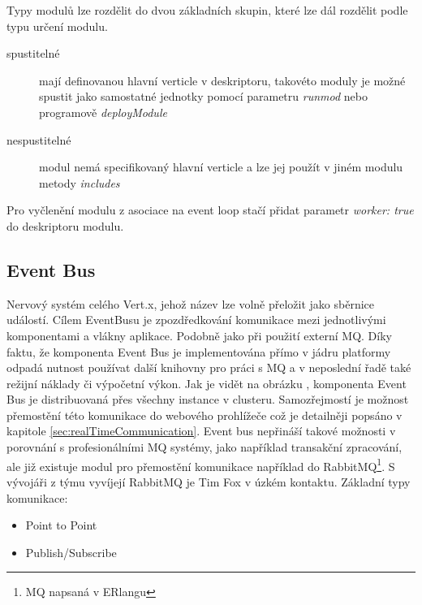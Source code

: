 Typy modulů lze rozdělit do dvou základních skupin, které lze dál rozdělit podle typu určení modulu.

\begin{description}
\item[spustitelné]{mají definovanou hlavní verticle v deskriptoru, takovéto moduly je možné spustit jako samostatné jednotky pomocí parametru \emph{runmod} nebo programově \emph{deployModule} }
\item[nespustitelné]{modul nemá specifikovaný hlavní verticle a lze jej použít v jiném modulu  metody \emph{includes}}
\end{description}

Pro vyčlenění modulu z asociace na event loop stačí přidat parametr \emph{worker: true} do deskriptoru modulu.

\subsection{Event Bus}\label{sub:eventBus}

Nervový systém celého Vert.x, jehož název lze volně přeložit jako sběrnice událostí. Cílem EventBusu je zpozdředkování komunikace mezi jednotlivými komponentami a vlákny aplikace. Podobně jako při použití externí MQ. Díky faktu, že komponenta Event Bus je implementována přímo v jádru platformy odpadá nutnost používat další knihovny pro práci s MQ a v neposlední řadě také režijní náklady či výpočetní výkon. Jak je vidět na obrázku , komponenta Event Bus je distribuovaná přes všechny instance v clusteru. Samozřejmostí je možnost přemostění této komunikace do webového prohlížeče což je detailněji popsáno v kapitole \ref{sec:realTimeCommunication}. Event bus nepřináší takové možnosti v porovnání s profesionálními MQ systémy, jako například transakční zpracování, ale již existuje modul pro přemostění komunikace například do RabbitMQ\footnote{MQ napsaná v ERlangu}. S vývojáři z týmu vyvíjejí RabbitMQ je Tim Fox v úzkém kontaktu\cite{vertxNodejs}. Základní typy komunikace:
\begin{itemize}
\item{Point to Point}
\item{Publish/Subscribe}
\end{itemize}

